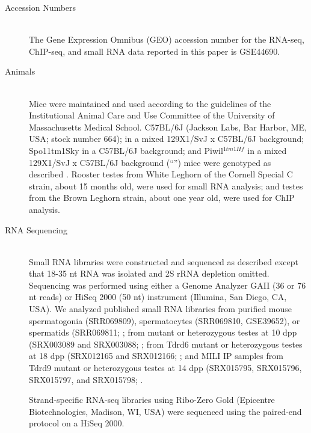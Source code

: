 \begin{description}
    \item[Accession Numbers] \hfill \\
    The Gene Expression Omnibus (GEO) accession number for the RNA-seq, ChIP-seq, and small RNA data reported in this paper is GSE44690.

    \item[Animals] \hfill \\
    Mice were maintained and used according to the guidelines of the Institutional Animal Care and Use Committee of the University of Massachusetts Medical School. C57BL/6J (Jackson Labs, Bar Harbor, ME, USA; stock number 664); \mybrepro{} in a mixed 129X1/SvJ x C57BL/6J background; Spo11tm1Sky in a C57BL/6J background; and Piwil$^{1tm1Hf}$ in a mixed 129X1/SvJ x C57BL/6J background (``\miwi{}'') mice were genotyped as described \citep{Baudat2000c, Deng2002c, Bolcun-Filas2011}. Rooster testes from White Leghorn of the Cornell Special C strain, about 15 months old, were used for small RNA analysis; and testes from the Brown Leghorn strain, about one year old, were used for ChIP analysis.

    \item[RNA Sequencing] \hfill \\
    Small RNA libraries were constructed and sequenced as described \citep{Ghildiyal2008, Seitz2008} except that 18-35 nt RNA was isolated and 2S rRNA depletion omitted. Sequencing was performed using either a Genome Analyzer GAII (36 or 76 nt reads) or HiSeq 2000 (50 nt) instrument (Illumina, San Diego, CA, USA). We analyzed published small RNA libraries from purified mouse spermatogonia (SRR069809), spermatocytes (SRR069810, GSE39652), or spermatids (SRR069811; \citep{Gan2011, Modzelewski2012}; from \mili{} mutant or heterozygous testes at 10 dpp (SRX003089 and SRX003088; \citep{Aravin2008a}; from Tdrd6 mutant or heterozygous testes at 18 dpp (SRX012165 and SRX012166; \citep{Vagin2009}; and MILI IP samples from Tdrd9 mutant or heterozygous testes at 14 dpp (SRX015795, SRX015796, SRX015797, and SRX015798; \citep{Shoji2009}.

    Strand-specific RNA-seq libraries \citep{Zhang2012} using Ribo-Zero Gold (Epicentre Biotechnologies, Madison, WI, USA) were sequenced using the paired-end protocol on a HiSeq 2000.
    

\end{description}

